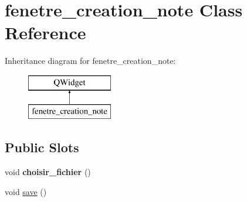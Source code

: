 \hypertarget{classfenetre__creation__note}{}\section{fenetre\+\_\+creation\+\_\+note Class Reference}
\label{classfenetre__creation__note}
Inheritance diagram for fenetre\+\_\+creation\+\_\+note\+:\begin{figure}[H]
\begin{center}
\leavevmode
\includegraphics[height=2.000000cm]{classfenetre__creation__note}
\end{center}
\end{figure}
\subsection*{Public Slots}
\begin{DoxyCompactItemize}
\item 
\mbox{\label{classfenetre__creation__note_aca59451560c2499954b64ed21db04eb2}} 
void {\bfseries choisir\+\_\+fichier} ()
\item 
void \hyperlink{classfenetre__creation__note_a148abe3a7d3ba11210f456d4cddce196}{save} ()
\end{DoxyCompactItemize}
